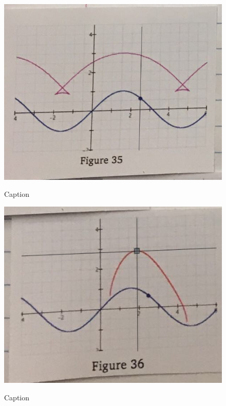 \begin{figure}[h]
  \centering
  \begin{minipage}[b]{\w}
    \centering
    \label{constructed:3}
    \includegraphics[width=\fw]{img/10-constructed/03.png}
    \caption{Caption}
    \vspace{4ex}
  \end{minipage} %
  \begin{minipage}[b]{\w}
    \centering
    \label{constructed:4}
    \includegraphics[width=\fw]{img/10-constructed/04.png}
    \caption{Caption}
    \vspace{4ex}
  \end{minipage} %

\end{figure}
